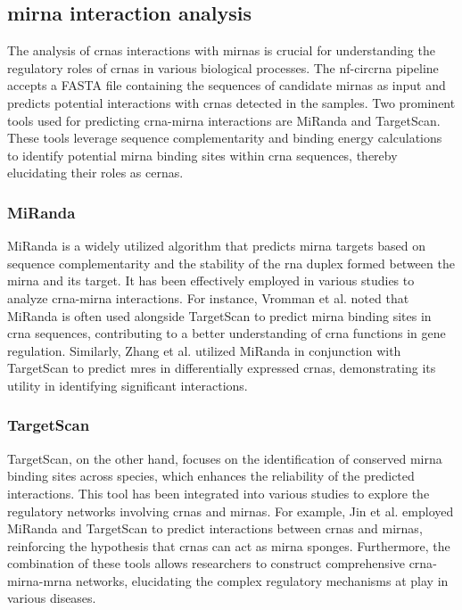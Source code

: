 \subsection{\gls{mirna} interaction analysis}
The analysis of \glspl{crna} interactions with \glspl{mirna} is crucial for
understanding the regulatory roles of \glspl{crna} in various biological
processes.
The \gls{nf-circrna} pipeline accepts a FASTA file containing the sequences of
candidate \glspl{mirna} as input and predicts potential interactions with
\glspl{crna} detected in the samples.
Two prominent tools used for predicting \gls{crna}-\gls{mirna} interactions are
MiRanda and TargetScan.
These tools leverage sequence complementarity and binding energy calculations
to identify potential \gls{mirna} binding sites within \gls{crna} sequences,
thereby elucidating their roles as \glspl{cerna}.

\subsubsection{MiRanda}
MiRanda is a widely utilized algorithm that predicts \gls{mirna} targets based
on sequence complementarity and the stability of the \gls{rna} duplex formed
between the \gls{mirna} and its target.
It has been effectively employed in various studies to analyze
\gls{crna}-\gls{mirna} interactions.
For instance, Vromman et al.
noted that
MiRanda is often used alongside TargetScan to predict \gls{mirna} binding sites
in
\gls{crna} sequences, contributing to a better understanding of \gls{crna}
functions
in gene regulation\supercite{vromman_closing_2021}.
Similarly, Zhang et al.
utilized
MiRanda in conjunction with TargetScan to predict \glspl{mre} in differentially
expressed \glspl{crna}, demonstrating its utility in
identifying significant interactions\supercite{zhang_microarray_2017}.

\subsubsection{TargetScan}
TargetScan, on the other hand, focuses on the identification of conserved
\gls{mirna} binding sites across species, which enhances the reliability of the
predicted interactions.
This tool has been integrated into various studies to explore the regulatory
networks involving \glspl{crna} and \glspl{mirna}.
For example, Jin et al.
employed MiRanda and TargetScan to predict interactions between \glspl{crna}
and
\glspl{mirna}, reinforcing the hypothesis that \glspl{crna} can act as
\gls{mirna}
sponges\supercite{jin_changes_2018}.
Furthermore, the combination of these tools allows researchers to construct
comprehensive \gls{crna}-\gls{mirna}-\gls{mrna} networks, elucidating the
complex regulatory mechanisms at play in various
diseases\supercite{he_construction_2021,zhang_construction_2021}.
